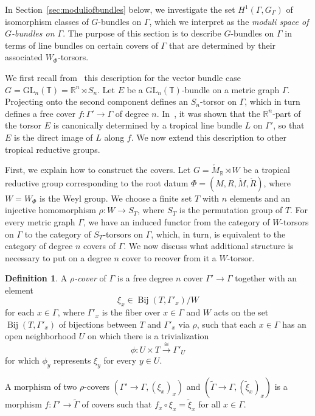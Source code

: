 \documentclass[10pt, a4paper]{amsart}
\theoremstyle{definition}
\newtheorem{definition}[theorem]{Definition}
\theoremstyle{myitemstyle}
\newcommand{\RR}{\mathbb{R}}
\newcommand{\TT}{\mathbb{T}}
\newcommand{\Mcheck}{{\check{M}}}
\newcommand{\Rcheck}{\check{R}}
\newcommand{\GL}{{\mathrm{GL}}}
\newcommand{\Ga}{\Gamma}
\DeclareMathOperator{\Bij}{Bij}
\begin{document}
In Section~\ref{sec:moduliofbundles} below, we investigate the set $H^1(\Ga,G_{\Ga})$ of isomorphism classes of $G$-bundles on $\Ga$, which we interpret as the \emph{moduli space of $G$-bundles on $\Gamma$}. The purpose of this section is to describe $G$-bundles on $\Gamma$ in terms of line bundles on certain covers of $\Gamma$ that are determined by their associated $W_{\Phi}$-torsors. 

We first recall from~\cite{2022GrossUlirschZakharov} this description for the vector bundle case $G=\GL_n(\TT)=\RR^n\rtimes S_n$. Let $E$ be a $\GL_n(\TT)$-bundle on a metric graph $\Gamma$. Projecting onto the second component defines an $S_n$-torsor on $\Gamma$, which in turn defines a free cover $f:\Gamma'\to \Gamma$ of degree $n$. In~\cite{2022GrossUlirschZakharov}, it was shown that the $\RR^n$-part of the torsor $E$ is canonically determined by a tropical line bundle $L$ on $\Gamma'$, so that $E$ is the direct image of $L$ along $f$. We now extend this description to other tropical reductive groups.

First, we explain how to construct the covers. Let $G=\Mcheck_{\RR}\rtimes W$ be a tropical reductive group corresponding to the root datum $\Phi=(M,R,\Mcheck,\Rcheck)$, where $W=W_{\Phi}$ is the Weyl group. We choose a finite set $T$ with $n$ elements and an injective homomorphism $\rho:W\to S_T$, where $S_T$ is the permutation group of $T$. For every metric graph $\Ga$, we have an induced functor from the category of $W$-torsors on $\Ga$ to the category of $S_T$-torsors on $\Ga$, which, in turn, is equivalent to the category of degree $n$ covers of $\Ga$. We now discuss what additional structure is necessary to put on a degree $n$ cover to recover from it a $W$-torsor.

\begin{definition} A \textit{$\rho$-cover} of $\Gamma$ is a free degree $n$ cover $\Gamma'\to \Gamma$ together with an element
    \[
    \xi_x\in \Bij(T,\Gamma'_x)/W
    \]
    for each $x\in \Gamma$, where $\Gamma'_x$ is the fiber over $x\in \Gamma$ and $W$ acts on the set $\Bij(T,\Gamma'_x)$ of bijections between $T$ and $\Gamma'_x$ via $\rho$, such that each $x\in \Gamma$ has an open neighborhood $U$ on which there is a trivialization
    \[
    \phi\colon U\times T\xrightarrow{\cong} \Gamma'_U
    \]
    for which $\phi_y$ represents $\xi_y$ for every $y\in U$.

    A morphism of two $\rho$-covers $(\Gamma'\to \Gamma, (\xi_x)_x)$ and $(\widetilde \Gamma\to \Gamma, (\widetilde\xi_x)_x)$ is a morphism $f\colon \Gamma'\to \widetilde \Gamma$ of covers such that $f_x\circ \xi_x=\widetilde \xi_x$ for all $x\in \Gamma$.
\end{definition}    
\end{document}

